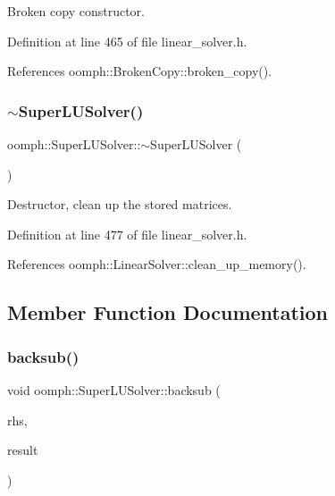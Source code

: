 Broken copy constructor. 



Definition at line 465 of file linear\+\_\+solver.\+h.



References oomph\+::\+Broken\+Copy\+::broken\+\_\+copy().

\mbox{\label{classoomph_1_1SuperLUSolver_a9ce5a1656ee0ec0d41d367567a990889}} 
\subsubsection{\texorpdfstring{$\sim$\+Super\+L\+U\+Solver()}{~SuperLUSolver()}}
{\footnotesize\ttfamily oomph\+::\+Super\+L\+U\+Solver\+::$\sim$\+Super\+L\+U\+Solver (\begin{DoxyParamCaption}{ }\end{DoxyParamCaption})\hspace{0.3cm}{\ttfamily [inline]}}



Destructor, clean up the stored matrices. 



Definition at line 477 of file linear\+\_\+solver.\+h.



References oomph\+::\+Linear\+Solver\+::clean\+\_\+up\+\_\+memory().



\subsection{Member Function Documentation}
\mbox{\label{classoomph_1_1SuperLUSolver_ae9c60b9515bcebc1e0509b7b0e51b5f9}} 
\subsubsection{\texorpdfstring{backsub()}{backsub()}}
{\footnotesize\ttfamily void oomph\+::\+Super\+L\+U\+Solver\+::backsub (\begin{DoxyParamCaption}\item[{const \hyperlink{classoomph_1_1DoubleVector}{Double\+Vector} \&}]{rhs,  }\item[{\hyperlink{classoomph_1_1DoubleVector}{Double\+Vector} \&}]{result }\end{DoxyParamCaption})}



